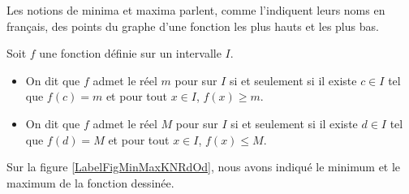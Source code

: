 Les notions de minima et maxima parlent, comme l'indiquent leurs noms en français, des points du graphe d'une fonction les plus hauts et les plus bas.

\begin{definition}
      Soit $f$ une fonction définie sur un intervalle $I$.
      \begin{itemize}
          \item On dit que $f$ admet le réel $m$ pour  sur $I$ si et seulement si il existe $c\in I$ tel que $f(c)=m$ et pour tout $x\in I$, $f(x)\geq m$. 
    \item On dit que $f$ admet le réel $M$ pour  sur $I$ si et seulement si il existe $d\in I$ tel que $f(d)=M$ et pour tout $x\in I$, $f(x)\leq M$.
      \end{itemize}
\end{definition}

Sur la figure \ref{LabelFigMinMaxKNRdOd}, nous avons indiqué le minimum et le maximum de la fonction dessinée.
\newcommand{\CaptionFigMinMaxKNRdOd}{Minimum et maximum d'une fonction.}


